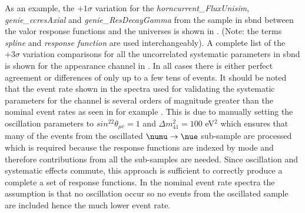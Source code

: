 As an example, the $+1\sigma$ variation for the \textit{horncurrent\_FluxUnisim}, \textit{genie\_ccresAxial} and \textit{genie\_ResDecayGamma} from the \nue sample in \gls{sbnd} between the \gls{valor} response functions and the universes is shown in . (Note: the terms \textit{spline} and \textit{response function} are used interchangeably). A complete list of the $+3\sigma$ variation comparisons for all the uncorrelated systematic parameters in \gls{sbnd} is shown for the \nue appearance channel in . In all cases there is either perfect agreement or differences of only up to a few tens of events. It should be noted that the event rate shown in the spectra used for validating the systematic parameters for the \nue channel is several orders of magnitude greater than the nominal event rates as seen in for example . This is due to manually setting the oscillation parameters to $sin^22\theta_{\mu e} = 1$ and $\Delta m_{41}^2 = 100$ eV$^2$ which ensures that many of the events from the oscillated $\numu \rightarrow \nue$ sub-sample are processed which is required because the response functions are indexed by mode and therefore contributions from all the sub-samples are needed. Since oscillation and systematic effects commute, this approach is sufficient to correctly produce a complete a set of response functions. In the nominal event rate spectra the assumption is that no oscillation occur so no events from the oscillated sample are included hence the much lower event rate. 

